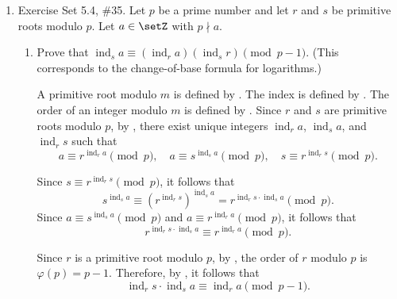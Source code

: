 \begin{enumerate}
\begin{enumerate}
\begin{subanswer}
      Since $\gcd(5, 16) = 1$, the congruence has a unique solution modulo $16$.
      Since $5 \cdot 13 = 65 = 16 \cdot 4 + 1$, it follows that $5^{-1} \equiv 13 \pmod{16}$.
      Therefore,
      \[
      \operatorname{ind}_3(x) \equiv 3 \cdot 13 = 39 \equiv 7 \pmod{16}.
      \]
      
      Since $\operatorname{ind}_3(x) \equiv 7 \pmod{16}$, it follows that $x \equiv 3^7 \equiv 11 \pmod{17}$.
      Therefore, the unique solution is $x \equiv 11 \pmod{17}$.
    \end{subanswer}
  \end{enumerate}


  \newpage

  \item Exercise Set 5.4, \#35. Let $p$ be a prime number and let $r$ and $s$ be primitive roots modulo $p$. 
  Let $a \in \setZ$ with $p \nmid a$.
  \begin{enumerate}
    \item Prove that $\operatorname{ind}_s a \equiv (\operatorname{ind}_r a)(\operatorname{ind}_s r) \pmod{p-1}$. 
    (This corresponds to the change-of-base formula for logarithms.)
    \begin{subprove}
      A primitive root modulo $m$ is defined by .
      The index is defined by .
      The order of an integer modulo $m$ is defined by .
      Since $r$ and $s$ are primitive roots modulo $p$, by , there exist unique integers $\operatorname{ind}_r a$, $\operatorname{ind}_s a$, and $\operatorname{ind}_r s$ such that
      \[
      a \equiv r^{\operatorname{ind}_r a} \pmod{p}, \quad a \equiv s^{\operatorname{ind}_s a} \pmod{p}, \quad s \equiv r^{\operatorname{ind}_r s} \pmod{p}.
      \]
      
      Since $s \equiv r^{\operatorname{ind}_r s} \pmod{p}$, it follows that
      \[
      s^{\operatorname{ind}_s a} \equiv (r^{\operatorname{ind}_r s})^{\operatorname{ind}_s a} = r^{\operatorname{ind}_r s \cdot \operatorname{ind}_s a} \pmod{p}.
      \]
      Since $a \equiv s^{\operatorname{ind}_s a} \pmod{p}$ and $a \equiv r^{\operatorname{ind}_r a} \pmod{p}$, it follows that
      \[
      r^{\operatorname{ind}_r s \cdot \operatorname{ind}_s a} \equiv r^{\operatorname{ind}_r a} \pmod{p}.
      \]
      
      Since $r$ is a primitive root modulo $p$, by , the order of $r$ modulo $p$ is $\varphi(p) = p-1$.
      Therefore, by , it follows that
      \[
      \operatorname{ind}_r s \cdot \operatorname{ind}_s a \equiv \operatorname{ind}_r a \pmod{p-1}.
      \]
      

\end{subprove}
\end{enumerate}
\end{enumerate}
